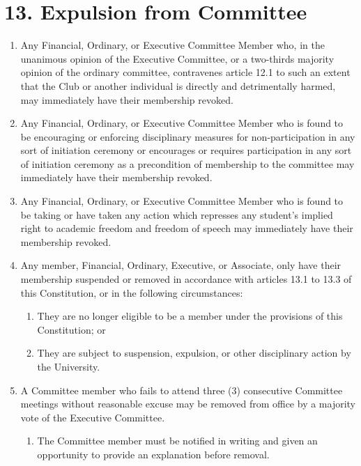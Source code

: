 \documentclass[12pt]{article}
\begin{document}
\section{13. Expulsion from Committee}
\begin{enumerate}[label=13.\arabic*]
\item Any Financial, Ordinary, or Executive Committee Member who, in the unanimous opinion of the Executive Committee, or a two-thirds majority opinion of the ordinary committee, contravenes article 12.1 to such an extent that the Club or another individual is directly and detrimentally harmed, may immediately have their membership revoked.
\item Any Financial, Ordinary, or Executive Committee Member who is found to be encouraging or enforcing disciplinary measures for non-participation in any sort of initiation ceremony or encourages or requires participation in any sort of initiation ceremony as a precondition of membership to the committee may immediately have their membership revoked.
\item Any Financial, Ordinary, or Executive Committee Member who is found to be taking or have taken any action which represses any student's implied right to academic freedom and freedom of speech may immediately have their membership revoked.
\item Any member, Financial, Ordinary, Executive, or Associate, only have their membership suspended or removed in accordance with articles 13.1 to 13.3 of this Constitution, or in the following circumstances:
    \begin{enumerate}[label=\theenumi.\arabic*]
        \item They are no longer eligible to be a member under the provisions of this Constitution; or
        \item They are subject to suspension, expulsion, or other disciplinary action by the University.
    \end{enumerate}
\item A Committee member who fails to attend three (3) consecutive Committee meetings without reasonable excuse may be removed from office by a majority vote of the Executive Committee.
    \begin{enumerate}[label=\theenumi.\arabic*]
        \item The Committee member must be notified in writing and given an opportunity to provide an explanation before removal.
    \end{enumerate}
\end{enumerate}
\end{document}
